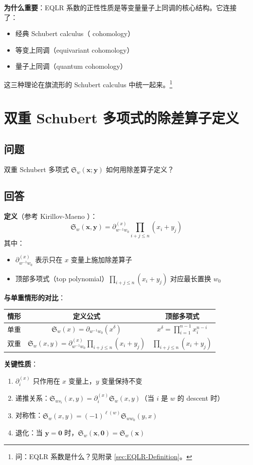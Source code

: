 \textbf{为什么重要}：EQLR 系数的正性性质是等变量量子上同调的核心结构。它连接了：
\begin{itemize}
\item 经典 Schubert calculus（ cohomology）
\item 等变上同调（equivariant cohomology）
\item 量子上同调（quantum cohomology）
\end{itemize}这三种理论在旗流形的 Schubert calculus 中统一起来。\footnote{问：EQLR 系数是什么？见附录 \cref{sec:EQLR-Definition}。}
\section{双重 Schubert 多项式的除差算子定义}\label{sec:DoubleSchubertDividedDifference}
\subsection{问题}
双重 Schubert 多项式 $\mathfrak{S}_w(\mathbf{x};\mathbf{y})$ 如何用除差算子定义？
\subsection{回答}
\textbf{定义}（参考 Kirillov-Maeno \cite{KM}）：$$\boxed{\mathfrak{S}_w(\mathbf{x}, \mathbf{y}) = \partial_{w^{-1}w_0}^{(x)} \prod_{i+j\leq n}(x_i+y_j)}$$其中：
\begin{itemize}
\item $\partial_{w^{-1}w_0}^{(x)}$ 表示只在 $x$ 变量上施加除差算子
\item 顶部多项式（top polynomial）$\prod_{i+j\leq n}(x_i+y_j)$ 对应最长置换 $w_0$
\end{itemize}

\textbf{与单重情形的对比}：
\begin{center}
\begin{tabular}{c|c|c}情形 & 定义公式 & 顶部多项式 \\ \hline 单重 & $\mathfrak{S}_w(x) = \partial_{w^{-1}w_0}(x^\delta)$ & $x^\delta = \prod_{i=1}^{n-1} x_i^{n-i}$ \\ 双重 & $\mathfrak{S}_w(x,y) = \partial_{w^{-1}w_0}^{(x)} \prod_{i+j\leq n}(x_i+y_j)$ & $\prod_{i+j\leq n}(x_i+y_j)$
\end{tabular}
\end{center}\textbf{关键性质}：
\begin{enumerate}
\item $\partial_i^{(x)}$ 只作用在 $x$ 变量上，$y$ 变量保持不变\item 递推关系：$\mathfrak{S}_{ws_i}(x,y) = \partial_i^{(x)} \mathfrak{S}_w(x,y)$（当 $i$ 是 $w$ 的 descent 时）\item 对称性：$\mathfrak{S}_w(x,y) = (-1)^{\ell(w)} \mathfrak{S}_{w w_0}(y,x)$\item 退化：当 $\mathbf{y} = \mathbf{0}$ 时，$\mathfrak{S}_w(\mathbf{x},\mathbf{0}) = \mathfrak{S}_w(\mathbf{x})$
\end{enumerate}

